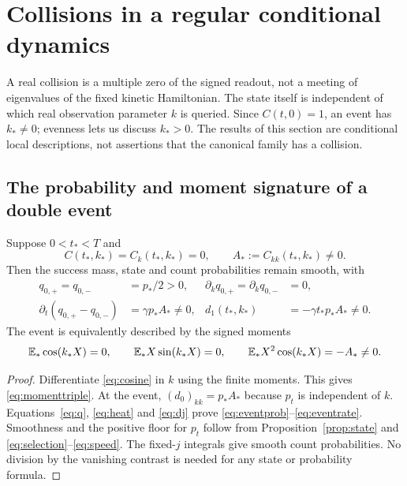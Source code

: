 \section{Collisions in a regular conditional dynamics}\label{sec:collisions}

A real collision is a multiple zero of the signed readout, not a meeting
of eigenvalues of the fixed kinetic Hamiltonian. The state itself is
independent of which real observation parameter $k$ is queried.
Since $C(t,0)=1$, an event has $k_*\ne0$; evenness lets us discuss
$k_*>0$. The results of this section are conditional local descriptions,
not assertions that the canonical family has a collision.

\subsection{The probability and moment signature of a double event}
\begin{proposition}\label{prop:event}
Suppose $0<t_*<T$ and
\begin{equation}\label{eq:double}
 C(t_*,k_*)=C_k(t_*,k_*)=0,\qquad A_*:=C_{kk}(t_*,k_*)\ne0.
\end{equation}
Then the success mass, state and count probabilities remain smooth, with
\begin{align}
 q_{0,+}=q_{0,-}&=p_*/2>0,&
 \partial_kq_{0,+}=\partial_kq_{0,-}&=0,\label{eq:eventprob}\\
 \partial_t(q_{0,+}-q_{0,-})&=\gamma p_*A_*\ne0,&
 d_1(t_*,k_*)&=-\gamma t_*p_*A_*\ne0.
 \label{eq:eventrate}
\end{align}
The event is equivalently described by the signed moments
\begin{equation}\label{eq:momenttriple}
 \mathbb E_*\cos(k_*X)=0,\qquad
 \mathbb E_*X\sin(k_*X)=0,\qquad
 \mathbb E_*X^2\cos(k_*X)=-A_*\ne0.
\end{equation}
\end{proposition}
\begin{proof}
Differentiate \eqref{eq:cosine} in $k$ using the finite moments.
This gives \eqref{eq:momenttriple}. At the event,
$(d_0)_{kk}=p_*A_*$ because $p_t$ is independent of $k$.
Equations~\eqref{eq:q}, \eqref{eq:heat} and \eqref{eq:dj} prove
\eqref{eq:eventprob}--\eqref{eq:eventrate}. Smoothness and the positive
floor for $p_t$ follow from Proposition~\ref{prop:state} and
\eqref{eq:selection}--\eqref{eq:speed}. The fixed-$j$ integrals give
smooth count probabilities. No division by the vanishing contrast is
needed for any state or probability formula.
\end{proof}

